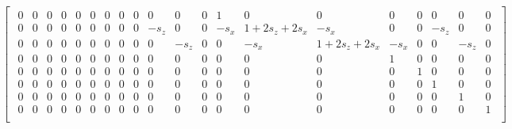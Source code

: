\begin{landscape}
\begin{equation}
{\begin{bmatrix}
\begin{array}{cccc|cccc|cccc|cccc|cccc}
       \hline
       0 & 0 & 0 & 0 & 0 & 0 & 0 & 0 & 0 & 0 & 0 & 0 & 1 & 0 & 0 & 0 & 0 & 0 & 0 & 0 \\ %
       0 & 0 & 0 & 0 & 0 & 0 & 0 & 0 & 0 & -s_z & 0 & 0 & -s_x & 1+2s_z+2s_x & -s_x & 0 & 0 & -s_z & 0 & 0 \\ %
       0 & 0 & 0 & 0 & 0 & 0 & 0 & 0 & 0 & 0 & -s_z & 0 & 0 & -s_x & 1+2s_z+2s_x & -s_x & 0 & 0 & -s_z & 0 \\ %
       0 & 0 & 0 & 0 & 0 & 0 & 0 & 0 & 0 & 0 & 0 & 0 & 0 & 0 & 0 & 1 & 0 & 0 & 0 & 0 \\ %
       \hline
       0 & 0 & 0 & 0 & 0 & 0 & 0 & 0 & 0 & 0 & 0 & 0 & 0 & 0 & 0 & 0 & 1 & 0 & 0 & 0 \\ %
       0 & 0 & 0 & 0 & 0 & 0 & 0 & 0 & 0 & 0 & 0 & 0 & 0 & 0 & 0 & 0 & 0 & 1 & 0 & 0 \\ %
       0 & 0 & 0 & 0 & 0 & 0 & 0 & 0 & 0 & 0 & 0 & 0 & 0 & 0 & 0 & 0 & 0 & 0 & 1 & 0 \\ %
       0 & 0 & 0 & 0 & 0 & 0 & 0 & 0 & 0 & 0 & 0 & 0 & 0 & 0 & 0 & 0 & 0 & 0 & 0 & 1 \\ %
   \end{array}
    \end{bmatrix}
\label{eq:2D54A}
}
\end{equation}

\end{landscape}




